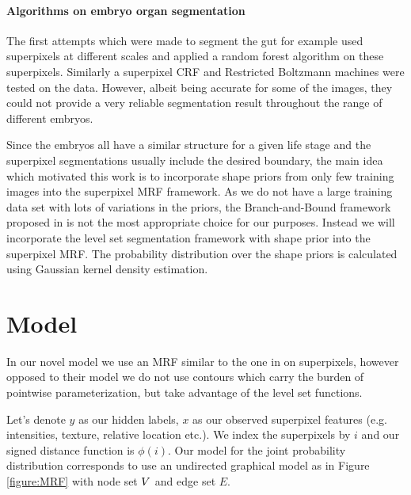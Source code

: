 \documentclass{article} %
\begin{document}
\paragraph{Algorithms on embryo organ segmentation}
The first attempts which were made to segment the gut for example used superpixels at different scales and applied a random forest algorithm on these superpixels. Similarly a superpixel CRF and Restricted Boltzmann machines were tested on the data. However, albeit being accurate for some of the images, they could not provide a very reliable segmentation result throughout the range of different embryos. 

Since the embryos all have a similar structure for a given life stage and the superpixel segmentations usually include the desired boundary, the main idea which motivated this work is to incorporate shape priors from only few training images into the superpixel MRF framework. As we do not have a large training data set with lots of variations in the priors, the Branch-and-Bound framework proposed in \cite{Lempitsky_BranchMin} is not the most appropriate choice for our purposes. Instead we will incorporate the level set segmentation framework with shape prior into the superpixel MRF. The probability distribution over the shape priors is calculated using Gaussian kernel density estimation.

\section{Model}
\label{model}
In our novel model we use an MRF similar to the one in \cite{Huang04_MRFDM} on superpixels, however opposed to their model we do not use contours which carry the burden of pointwise parameterization, but take advantage of the level set functions. 

Let's denote $y$ as our hidden labels, $x$ as our observed superpixel features (e.g. intensities, texture, relative location etc.). We index the superpixels by $i$ and our signed distance function is $\phi(i)$. Our model for the joint probability distribution corresponds to use an undirected graphical model as in Figure \ref{figure:MRF} with node set $V$ and edge set $E$. 
\end{document}
